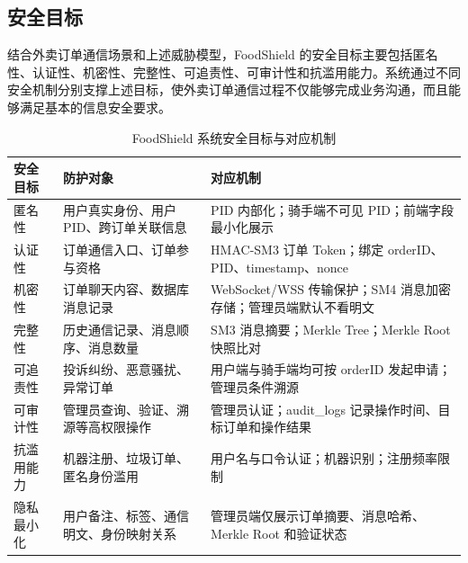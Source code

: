 \subsection{安全目标}

结合外卖订单通信场景和上述威胁模型，FoodShield 的安全目标主要包括匿名性、认证性、机密性、完整性、可追责性、可审计性和抗滥用能力。系统通过不同安全机制分别支撑上述目标，使外卖订单通信过程不仅能够完成业务沟通，而且能够满足基本的信息安全要求。

\begin{table}[ht]
\centering
\caption{FoodShield 系统安全目标与对应机制}
\renewcommand{\arraystretch}{1.7}
\setlength{\tabcolsep}{8pt}

\begin{tabular}{p{3.0cm}p{5.0cm}p{5.0cm}}
\toprule
\textbf{安全目标} & \textbf{防护对象} & \textbf{对应机制} \\
\midrule

匿名性
&
用户真实身份、用户 PID、跨订单关联信息
&
PID 内部化；骑手端不可见 PID；前端字段最小化展示
\\

认证性
&
订单通信入口、订单参与资格
&
HMAC-SM3 订单 Token；绑定 orderID、PID、timestamp、nonce
\\

机密性
&
订单聊天内容、数据库消息记录
&
WebSocket/WSS 传输保护；SM4 消息加密存储；管理员端默认不看明文
\\

完整性
&
历史通信记录、消息顺序、消息数量
&
SM3 消息摘要；Merkle Tree；Merkle Root 快照比对
\\

可追责性
&
投诉纠纷、恶意骚扰、异常订单
&
用户端与骑手端均可按 orderID 发起申请；管理员条件溯源
\\

可审计性
&
管理员查询、验证、溯源等高权限操作
&
管理员认证；audit\_logs 记录操作时间、目标订单和操作结果
\\

抗滥用能力
&
机器注册、垃圾订单、匿名身份滥用
&
用户名与口令认证；机器识别；注册频率限制
\\

隐私最小化
&
用户备注、标签、通信明文、身份映射关系
&
管理员端仅展示订单摘要、消息哈希、Merkle Root 和验证状态
\\

\bottomrule
\end{tabular}
\end{table}




